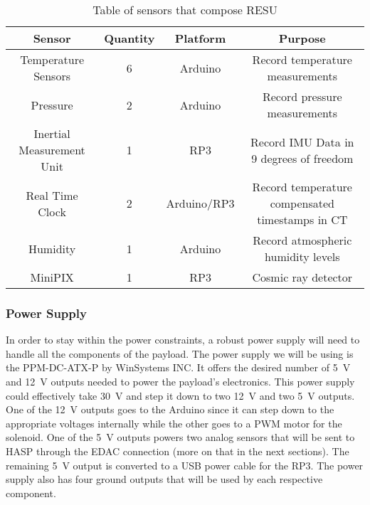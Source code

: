 \begin{table}[h!]
\centering
\caption{Table of sensors that compose RESU}
\label{tab:Sensors}
\bigskip
\begin{tabular}{|c|c|c|c|}
\hline
\multicolumn{1}{|c|}{\bfseries Sensor} & {\bfseries Quantity} & {\bfseries Platform} & {\bfseries Purpose} \\
\hline
    Temperature Sensors         	& 6 & Arduino  		& Record temperature measurements  \\ \hline
    Pressure        				& 2 & Arduino 		& Record pressure measurements \\ \hline
    Inertial Measurement Unit       & 1 & RP3    		& Record IMU Data in 9 degrees of freedom \\ \hline    
    Real Time Clock 				& 2 & Arduino/RP3 	& Record temperature compensated timestamps in CT \\\hline
    Humidity        				& 1 & Arduino 		& Record atmospheric humidity levels \\ \hline
    MiniPIX         				& 1 & RP3     		& Cosmic ray detector \\ \hline
\end{tabular}
\end{table}

\subsubsection{Power Supply}

In order to stay within the power constraints, a robust power supply will need to  handle all the components of the payload.  The power supply we will be using is the PPM-DC-ATX-P by WinSystems INC.  It offers the desired number of \SI{+5}{\volt} and \SI{+12}{\volt} outputs needed to power the payload's electronics.  This power supply could effectively take \SI{+30}{\volt} and step it down to two \SI{+12}{\volt} and two \SI{+5 }{\volt} outputs.  One of the \SI{+12}{\volt} outputs goes to the Arduino since it can step down to the appropriate voltages internally while the other goes to a PWM motor for the solenoid.  One of the \SI{+5 }{\volt} outputs powers two analog sensors that will be sent to HASP through the EDAC connection (more on that in the next sections).  The remaining \SI{+5 }{\volt} output is converted to a USB power cable for the RP3.  The power supply also has four ground outputs that will be used by each respective component.  


